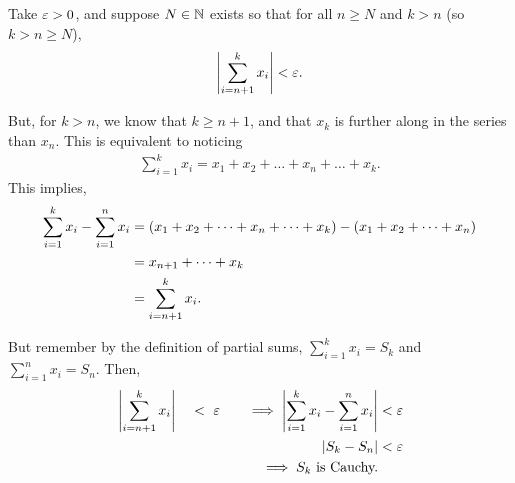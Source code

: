 \documentclass[12pt]{article}
\theoremstyle{definition}
\renewenvironment{proof}[1][\proofname]{\vspace{-10pt}\begin{replacementproof}}{\end{replacementproof}}
\begin{document}
            \begin{proof}
                Take $\varepsilon > 0$, and suppose $N \in \mathbb{N}$ exists so that for all $n \geq N$ and $k > n$ (so $k > n \geq N$),
                \begin{align*}
                    \left|\sum_{i = n + 1}^{k}x_{i}\right| < \varepsilon.
                \end{align*}

                But, for $k > n$, we know that $k \geq n + 1$, and that $x_{k}$ is further along in the series than $x_{n}$. This is equivalent to noticing
                \begin{align*}
                    \sum_{i = 1}^{k}x_{i} = x_{1} + x_{2} + \dots + x_{n} + \dots + x_{k}. 
                \end{align*}
                This implies,
                \begin{align*}
                    \sum_{i = 1}^{k}x_{i} - \sum_{i = 1}^{n}x_{i} &= \left(x_{1} + x_{2} + \dots + x_{n} + \dots + x_{k}\right) - \left(x_{1} + x_{2} + \dots + x_{n}\right) \\
                                                                  &= x_{n + 1} + \dots + x_{k} \\
                                                                  &= \sum_{i = n + 1}^{k}x_{i}.
                \end{align*}

                But remember by the definition of partial sums, $\sum_{i = 1}^{k}x_{i} = S_{k}$ and $\sum_{i = 1}^{n}x_{i} = S_{n}$. Then,
                \begin{alignat*}{3}
                    &\left|\sum_{i = n + 1}^{k}x_{i}\right| ~ &< ~ \varepsilon 
                    &\quad &\implies \left|\sum_{i = 1}^{k}x_{i} - \sum_{i = 1}^{n}x_{i}\right| &< \varepsilon \\
                    & & & &\left|S_{k} - S_{n}\right| &< \varepsilon \\
                    & & & &\implies S_{k} ~ \text{is Cauchy.} &     
                 \end{alignat*}
            \end{proof}
\end{document}
